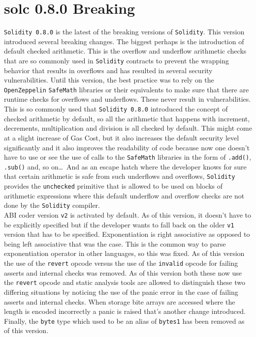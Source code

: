 \section{solc 0.8.0 Breaking}
\verb|Solidity 0.8.0| is the latest of the breaking versions of \verb|Solidity|. This version introduced several breaking changes. The biggest perhaps is the introduction of default checked arithmetic. This is the overflow and underflow arithmetic checks that are so commonly used in \verb|Solidity| contracts to prevent the wrapping behavior that results in overflows and has resulted in several security vulnerabilities. Until this version, the best practice was to rely on the \verb|OpenZeppelin| \verb|SafeMath| libraries or their equivalents to make sure that there are runtime checks for overflows and underflows. These never result in vulnerabilities. This is so commonly used that \verb|Solidity 0.8.0| introduced the concept of checked arithmetic by default, so all the arithmetic that happens with increment, decrements, multiplication and division is all checked by default. This might come at a slight increase of Gas Cost, but it also increases the default security level significantly and it also improves the readability of code because now one doesn't have to use or see the use of calls to the \verb|SafeMath| libraries in the form of \verb|.add()|, \verb|.sub()| and, so on\dots\, And as an escape hatch where the developer knows for sure that certain arithmetic is safe from such underflows and overflows, \verb|Solidity| provides the \verb|unchecked| primitive that is allowed to be used on blocks of arithmetic expressions where this default underflow and overflow checks are not done by the \verb|Solidity| compiler.\\

ABI coder version \verb|v2| is activated by default. As of this version, it doesn't have to be explicitly specified but if the developer wants to fall back on the older \verb|v1| version that has to be specified. Exponentiation is right associative as opposed to being left associative that was the case. This is the common way to parse exponentiation operator in other languages, so this was fixed. As of this version the use of the \verb|revert| opcode versus the use of the \verb|invalid| opcode for failing asserts and internal checks was removed. As of this version both these now use the \verb|revert| opcode and static analysis tools are allowed to distinguish these two differing situations by noticing the use of the panic error in the case of failing asserts and internal checks. When storage bite arrays are accessed where the length is encoded incorrectly a panic is raised that's another change introduced. Finally, the \verb|byte| type which used to be an alias of \verb|bytes1| has been removed as of this version.

